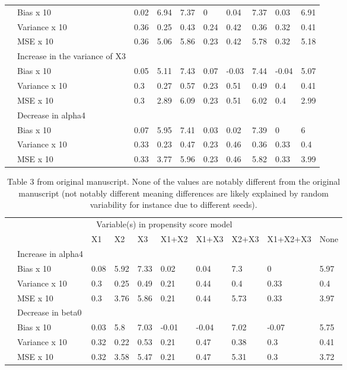 \documentclass[10,a4paperpaper,]{article}
\begin{document}
\begin{table}[ht]
\begin{tabular}{rlllllllll}
   & Bias x 10 & 0.02 & 6.94 & 7.37 & 0 & 0.04 & 7.37 & 0.03 & 6.91 \\ 
   & Variance x 10 & 0.36 & 0.25 & 0.43 & 0.24 & 0.42 & 0.36 & 0.32 & 0.41 \\ 
   & MSE x 10 & 0.36 & 5.06 & 5.86 & 0.23 & 0.42 & 5.78 & 0.32 & 5.18 \\ 
   & Increase in the variance of X3 &  &  &  &  &  &  &  &  \\ 
   & Bias x 10 & 0.05 & 5.11 & 7.43 & 0.07 & -0.03 & 7.44 & -0.04 & 5.07 \\ 
   & Variance x 10 & 0.3 & 0.27 & 0.57 & 0.23 & 0.51 & 0.49 & 0.4 & 0.41 \\ 
   & MSE x 10 & 0.3 & 2.89 & 6.09 & 0.23 & 0.51 & 6.02 & 0.4 & 2.99 \\ 
   & Decrease in alpha4 &  &  &  &  &  &  &  &  \\ 
   & Bias x 10 & 0.07 & 5.95 & 7.41 & 0.03 & 0.02 & 7.39 & 0 & 6 \\ 
   & Variance x 10 & 0.33 & 0.23 & 0.47 & 0.23 & 0.46 & 0.36 & 0.33 & 0.4 \\ 
   & MSE x 10 & 0.33 & 3.77 & 5.96 & 0.23 & 0.46 & 5.82 & 0.33 & 3.99 \\  
   \hline
\end{tabular}
\end{table}

\clearpage

\begin{table}[ht]
\centering
\begin{tabular}{rlllllllll}
  \hline
  & \multicolumn{8}{c}{Variable(s) in propensity score model} \\
 & & X1 & X2 & X3 & X1+X2 & X1+X3 & X2+X3 & X1+X2+X3 & None \\
 \hline
   & Increase in alpha4 &  &  &  &  &  &  &  &  \\ 
   & Bias x 10 & 0.08 & 5.92 & 7.33 & 0.02 & 0.04 & 7.3 & 0 & 5.97 \\ 
   & Variance x 10 & 0.3 & 0.25 & 0.49 & 0.21 & 0.44 & 0.4 & 0.33 & 0.4 \\ 
   & MSE x 10 & 0.3 & 3.76 & 5.86 & 0.21 & 0.44 & 5.73 & 0.33 & 3.97 \\ 
   & Decrease in beta0 &  &  &  &  &  &  &  &  \\ 
   & Bias x 10 & 0.03 & 5.8 & 7.03 & -0.01 & -0.04 & 7.02 & -0.07 & 5.75 \\ 
   & Variance x 10 & 0.32 & 0.22 & 0.53 & 0.21 & 0.47 & 0.38 & 0.3 & 0.41 \\ 
   & MSE x 10 & 0.32 & 3.58 & 5.47 & 0.21 & 0.47 & 5.31 & 0.3 & 3.72 \\ 
   \hline
\end{tabular}
\caption{Table 3 from original manuscript. None of the values are notably different from the original manuscript (not notably different meaning differences are likely explained by random variability for instance due to different seeds).}
\end{table}
\end{document}
